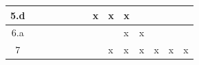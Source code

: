 \begin{table}[ht!]
\begin{tabular}{|c|l|l|l|l|l|l|l|l|l|l|l|l|l|}
5.d                                               &                        &                        &                        &                        &                        &                        & x                      & x                      & x                      &                        &   &   &   \\ \hline
6.a                                               &                        &                        &                        &                        &                        &                        &                        &                        & x                      & x                      &   &   &   \\ \hline
7                                                 &                        &                        &                        &                        &                        &                        &                        & x                       & x                       &  x                      & x & x & x \\ \hline
\end{tabular}
\end{table}